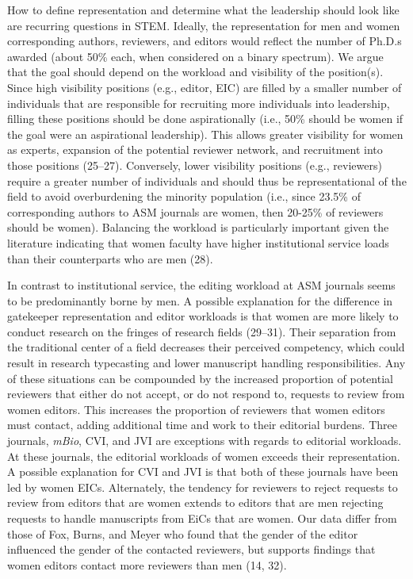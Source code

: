 \documentclass[11pt,]{article}
\begin{document}
How to define representation and determine what the leadership should
look like are recurring questions in STEM. Ideally, the representation
for men and women corresponding authors, reviewers, and editors would
reflect the number of Ph.D.s awarded (about 50\% each, when considered
on a binary spectrum). We argue that the goal should depend on the
workload and visibility of the position(s). Since high visibility
positions (e.g., editor, EIC) are filled by a smaller number of
individuals that are responsible for recruiting more individuals into
leadership, filling these positions should be done aspirationally (i.e.,
50\% should be women if the goal were an aspirational leadership). This
allows greater visibility for women as experts, expansion of the
potential reviewer network, and recruitment into those positions
(25--27). Conversely, lower visibility positions (e.g., reviewers)
require a greater number of individuals and should thus be
representational of the field to avoid overburdening the minority
population (i.e., since 23.5\% of corresponding authors to ASM journals
are women, then 20-25\% of reviewers should be women). Balancing the
workload is particularly important given the literature indicating that
women faculty have higher institutional service loads than their
counterparts who are men (28).

In contrast to institutional service, the editing workload at ASM
journals seems to be predominantly borne by men. A possible explanation
for the difference in gatekeeper representation and editor workloads is
that women are more likely to conduct research on the fringes of
research fields (29--31). Their separation from the traditional center
of a field decreases their perceived competency, which could result in
research typecasting and lower manuscript handling responsibilities. Any
of these situations can be compounded by the increased proportion of
potential reviewers that either do not accept, or do not respond to,
requests to review from women editors. This increases the proportion of
reviewers that women editors must contact, adding additional time and
work to their editorial burdens. Three journals, \emph{mBio}, CVI, and
JVI are exceptions with regards to editorial workloads. At these
journals, the editorial workloads of women exceeds their representation.
A possible explanation for CVI and JVI is that both of these journals
have been led by women EICs. Alternately, the tendency for reviewers to
reject requests to review from editors that are women extends to editors
that are men rejecting requests to handle manuscripts from EiCs that are
women. Our data differ from those of Fox, Burns, and Meyer who found
that the gender of the editor influenced the gender of the contacted
reviewers, but supports findings that women editors contact more
reviewers than men (14, 32).
\end{document}
